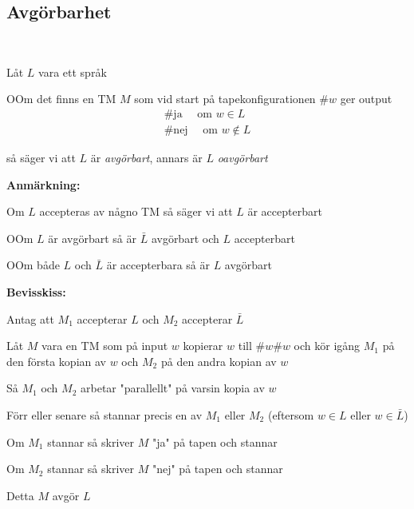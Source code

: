 \subsection{Avgörbarhet}\hfill\\\par
\noindent Låt $L$ vara ett språk
\par\bigskip
\begin{theo}
  OOm det finns en TM $M$ som vid start på tapekonfigurationen $\#w$ ger output
  \begin{equation*}
    \begin{gathered}
      \#\text{ja}\quad\text{ om } w\in L\\
      \#\text{nej}\quad\text{ om } w\notin L
    \end{gathered}
  \end{equation*}\par
  \noindent så säger vi att $L$ är \textit{avgörbart}, annars är $L$ \textit{oavgörbart}
\end{theo}
\par\bigskip
\noindent\textbf{Anmärkning:}\par
\noindent Om $L$ accepteras av någno TM så säger vi att $L$ är accepterbart
\par\bigskip
\begin{theo}
  OOm $L$ är avgörbart så är $\bar{L}$ avgörbart och $L$ accepterbart
\end{theo}
\par\bigskip
\begin{theo}
  OOm både $L$ och $\bar{L}$ är accepterbara så är $L$ avgörbart
\end{theo}
\par\bigskip
\noindent\textbf{Bevisskiss:}\par
\noindent Antag att $M_1$ accepterar $L$ och $M_2$ accepterar $\bar{L}$\par
\noindent Låt $M$ vara en TM som på input $w$ kopierar $w$ till $\#w\#w$ och kör igång $M_1$ på den första kopian av $w$ och $M_2$ på den andra kopian av $w$
\par\bigskip
\noindent Så $M_1$ och $M_2$ arbetar "parallellt" på varsin kopia av $w$\par
\noindent Förr eller senare så stannar precis en av $M_1$ eller $M_2$ (eftersom $w\in L$ eller $w\in\bar{L}$)\par
\noindent Om $M_1$ stannar så skriver $M$ "ja" på tapen och stannar\par
\noindent Om $M_2$ stannar så skriver $M$ "nej" på tapen och stannar\par
\noindent Detta $M$ avgör $L$
